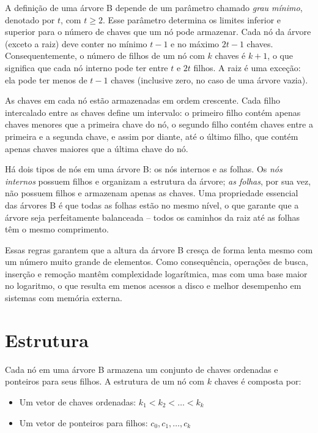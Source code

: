 A definição de uma árvore B depende de um parâmetro chamado \textit{grau mínimo}, denotado por $t$, com $t \geq 2$. 
Esse parâmetro determina os limites inferior e superior para o número de chaves que um nó pode armazenar. 
Cada nó da árvore (exceto a raiz) deve conter no mínimo $t - 1$ e no máximo $2t - 1$ chaves. 
Consequentemente, o número de filhos de um nó com $k$ chaves é $k + 1$, o que significa que cada nó interno pode ter entre $t$ e $2t$ filhos. 
A raiz é uma exceção: ela pode ter menos de $t - 1$ chaves (inclusive zero, no caso de uma árvore vazia).

As chaves em cada nó estão armazenadas em ordem crescente. 
Cada filho intercalado entre as chaves define um intervalo: o primeiro filho contém apenas chaves menores que a primeira chave do nó, o segundo filho contém chaves entre a primeira e a segunda chave, e assim por diante, até o último filho, que contém apenas chaves maiores que a última chave do nó.

Há dois tipos de nós em uma árvore B: os nós internos e as folhas. 
Os {\em nós internos} possuem filhos e organizam a estrutura da árvore; {\em as folhas}, por sua vez, não possuem filhos e armazenam apenas as chaves. 
Uma propriedade essencial das árvores B é que todas as folhas estão no mesmo nível, o que garante que a árvore seja perfeitamente balanceada -- todos os caminhos da raiz até as folhas têm o mesmo comprimento.

Essas regras garantem que a altura da árvore B cresça de forma lenta mesmo com um número muito grande de elementos. 
Como consequência, operações de busca, inserção e remoção mantêm complexidade logarítmica, mas com uma base maior no logaritmo, o que resulta em menos acessos a disco e melhor desempenho em sistemas com memória externa.

\section{Estrutura}

Cada nó em uma árvore B armazena um conjunto de chaves ordenadas e ponteiros para seus filhos. 
A estrutura de um nó com \( k \) chaves é composta por:

\begin{itemize}
  \item Um vetor de chaves ordenadas: \( k_1 < k_2 < \dots < k_k \)
  \item Um vetor de ponteiros para filhos: \( c_0, c_1, \dots, c_k \)
\end{itemize}

